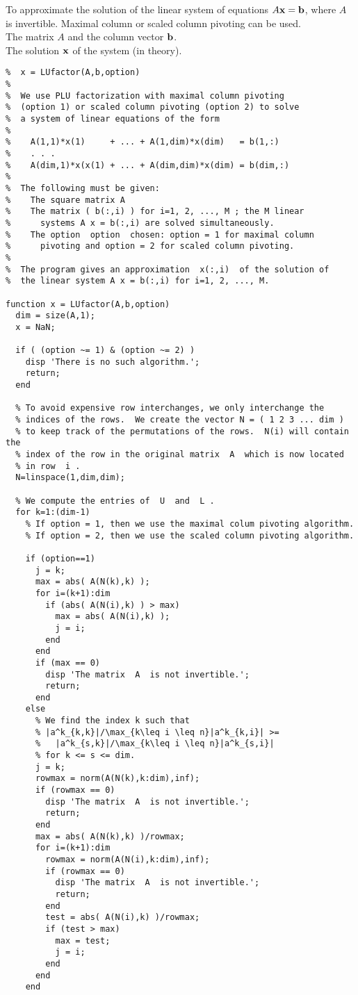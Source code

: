 \begin{code}[LU Decomposition]
To approximate the solution of the linear system of equations
$A\mathbf{x} = \mathbf{b}$, where $A$ is invertible.  Maximal column or
scaled column pivoting can be used.\\
 The matrix $A$ and the column vector $\mathbf{b}$.\\
 The solution $\mathbf{x}$ of the system (in theory).
\small
\begin{verbatim}
%  x = LUfactor(A,b,option)
%
%  We use PLU factorization with maximal column pivoting
%  (option 1) or scaled column pivoting (option 2) to solve
%  a system of linear equations of the form
%
%    A(1,1)*x(1)     + ... + A(1,dim)*x(dim)   = b(1,:)
%    . . .
%    A(dim,1)*x(x(1) + ... + A(dim,dim)*x(dim) = b(dim,:)
%
%  The following must be given:
%    The square matrix A
%    The matrix ( b(:,i) ) for i=1, 2, ..., M ; the M linear
%      systems A x = b(:,i) are solved simultaneously.
%    The option  option  chosen: option = 1 for maximal column
%      pivoting and option = 2 for scaled column pivoting.
%
%  The program gives an approximation  x(:,i)  of the solution of
%  the linear system A x = b(:,i) for i=1, 2, ..., M.

function x = LUfactor(A,b,option)
  dim = size(A,1);
  x = NaN;

  if ( (option ~= 1) & (option ~= 2) )
    disp 'There is no such algorithm.';
    return;
  end

  % To avoid expensive row interchanges, we only interchange the
  % indices of the rows.  We create the vector N = ( 1 2 3 ... dim )
  % to keep track of the permutations of the rows.  N(i) will contain the
  % index of the row in the original matrix  A  which is now located
  % in row  i .
  N=linspace(1,dim,dim);

  % We compute the entries of  U  and  L .
  for k=1:(dim-1)
    % If option = 1, then we use the maximal colum pivoting algorithm.
    % If option = 2, then we use the scaled column pivoting algorithm.

    if (option==1)
      j = k;
      max = abs( A(N(k),k) );
      for i=(k+1):dim
        if (abs( A(N(i),k) ) > max)
          max = abs( A(N(i),k) );
          j = i;
        end
      end
      if (max == 0)
        disp 'The matrix  A  is not invertible.';
        return;
      end
    else
      % We find the index k such that
      % |a^k_{k,k}|/\max_{k\leq i \leq n}|a^k_{k,i}| >=
      %   |a^k_{s,k}|/\max_{k\leq i \leq n}|a^k_{s,i}|
      % for k <= s <= dim.
      j = k;
      rowmax = norm(A(N(k),k:dim),inf);
      if (rowmax == 0)
        disp 'The matrix  A  is not invertible.';
        return;
      end
      max = abs( A(N(k),k) )/rowmax;
      for i=(k+1):dim
        rowmax = norm(A(N(i),k:dim),inf);
        if (rowmax == 0)
          disp 'The matrix  A  is not invertible.';
          return;
        end
        test = abs( A(N(i),k) )/rowmax;
        if (test > max)
          max = test;
          j = i;
        end
      end
    end


\end{verbatim}
\end{code}
